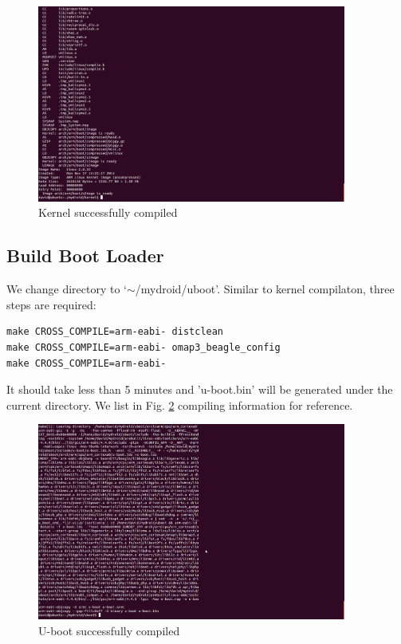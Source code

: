 \documentclass[12pt,journal,draftclsnofoot,onecolumn]{IEEEtran}
\begin{document}
\begin{figure}[ht]
	\centering
	\includegraphics[width=4in]{./figs/kernel.png}
	\caption{Kernel successfully compiled}
	\label{kernel}
\end{figure}


\subsection{Build Boot Loader}
We change directory to `$\sim$/mydroid/uboot'. Similar to kernel compilaton, three steps are required:

\begin{lstlisting}[language={make}]
make CROSS_COMPILE=arm-eabi- distclean
make CROSS_COMPILE=arm-eabi- omap3_beagle_config
make CROSS_COMPILE=arm-eabi-
\end{lstlisting}

It should take less than 5 minutes and 'u-boot.bin' will be generated under the current directory. We list in Fig. \ref{uboot} compiling information for reference.

\begin{figure}[ht]
	\centering
	\includegraphics[width=4in]{./figs/uboot.png}
	\caption{U-boot successfully compiled}
	\label{uboot}
\end{figure}
\end{document}
